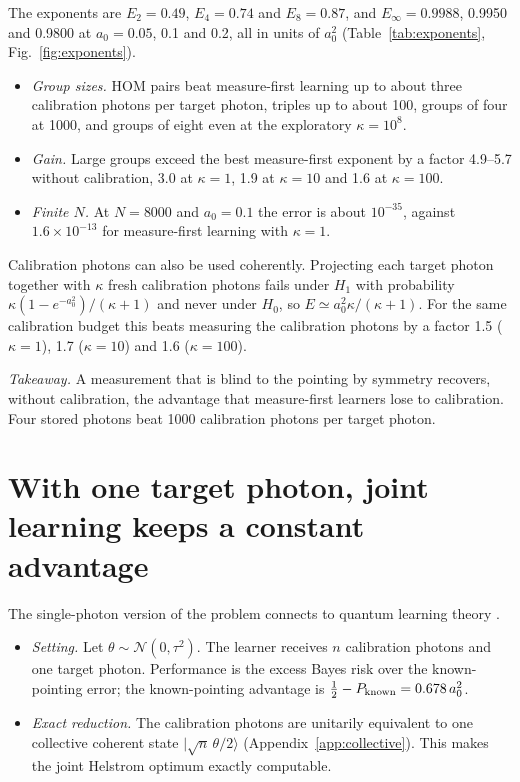 \documentclass[reprint,pra,aps,amsmath,amssymb,superscriptaddress,nofootinbib]{revtex4-2}
\newcommand{\ket}[1]{|#1\rangle}
\begin{document}
The exponents are $E_2=0.49$, $E_4=0.74$ and $E_8=0.87$, and $E_\infty=0.9988$, 0.9950 and 0.9800 at $a_0=0.05$, 0.1
and 0.2, all in units of $a_0^2$ (Table~\ref{tab:exponents}, Fig.~\ref{fig:exponents}).
\begin{itemize}
\item \emph{Group sizes.} HOM pairs beat measure-first learning up to about three calibration photons per target
  photon, triples up to about 100, groups of four at 1000, and groups of eight even at the exploratory
  $\kappa=10^8$.
\item \emph{Gain.} Large groups exceed the best measure-first exponent by a factor 4.9--5.7 without calibration,
  3.0 at $\kappa=1$, 1.9 at $\kappa=10$ and 1.6 at $\kappa=100$.
\item \emph{Finite $N$.} At $N=8000$ and $a_0=0.1$ the error is about $10^{-35}$, against $1.6\times10^{-13}$ for
  measure-first learning with $\kappa=1$.
\end{itemize}

Calibration photons can also be used coherently. Projecting each target photon together with $\kappa$ fresh
calibration photons fails under $H_1$ with probability $\kappa(1-e^{-a_0^2})/(\kappa+1)$ and never under $H_0$, so
$E\simeq a_0^2\kappa/(\kappa+1)$. For the same calibration budget this beats measuring the calibration photons by a
factor 1.5 ($\kappa=1$), 1.7 ($\kappa=10$) and 1.6 ($\kappa=100$).

\emph{Takeaway.} A measurement that is blind to the pointing by symmetry recovers, without calibration, the advantage
that measure-first learners lose to calibration. Four stored photons beat 1000 calibration photons per target
photon.

\section{With one target photon, joint learning keeps a constant advantage}
\label{sec:single}

The single-photon version of the problem connects to quantum learning theory \cite{Sentis2012,Guta2010,Sentis2015}.
\begin{itemize}
\item \emph{Setting.} Let $\theta\sim\mathcal N(0,\tau^2)$. The learner receives $n$ calibration photons and one
  target photon. Performance is the excess Bayes risk over the known-pointing error; the known-pointing advantage
  is $\tfrac12-P_{\rm known}=0.678\,a_0^2$.
\item \emph{Exact reduction.} The calibration photons are unitarily equivalent to one collective coherent state
  $\ket{\sqrt n\,\theta/2}$ (Appendix~\ref{app:collective}). This makes the joint Helstrom optimum exactly
  computable.
\end{itemize}
\end{document}
